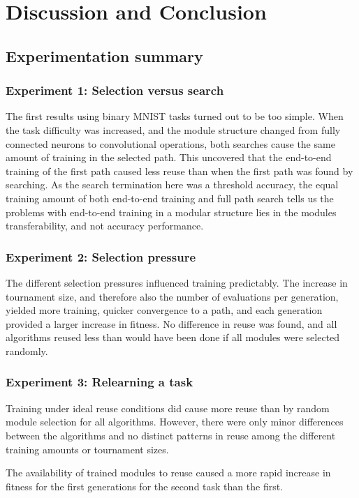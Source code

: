 \chapter{Discussion and Conclusion}

\section{Experimentation summary}
\subsection{Experiment 1: Selection versus search}
The first results using binary MNIST tasks turned out to be too simple. When the task difficulty was increased, and the module structure changed from fully connected neurons to convolutional operations, both searches cause the same amount of training in the selected path. This uncovered that the end-to-end training of the first path caused less reuse than when the first path was found by searching. As the search termination here was a threshold accuracy, the equal training amount of both end-to-end training and full path search tells us the problems with end-to-end training in a modular structure lies in the modules transferability, and not accuracy performance.

\subsection{Experiment 2: Selection pressure}
The different selection pressures influenced training predictably. The increase in tournament size, and therefore also the number of evaluations per generation, yielded more training, quicker convergence to a path, and each generation provided a larger increase in fitness. No difference in reuse was found, and all algorithms reused less than would have been done if all modules were selected randomly. 

\subsection{Experiment 3: Relearning a task}
Training under ideal reuse conditions did cause more reuse than by random module selection for all algorithms. However, there were only minor differences between the algorithms and no distinct patterns in reuse among the different training amounts or tournament sizes. 

The availability of trained modules to reuse caused a more rapid increase in fitness for the first generations for the second task than the first.  

